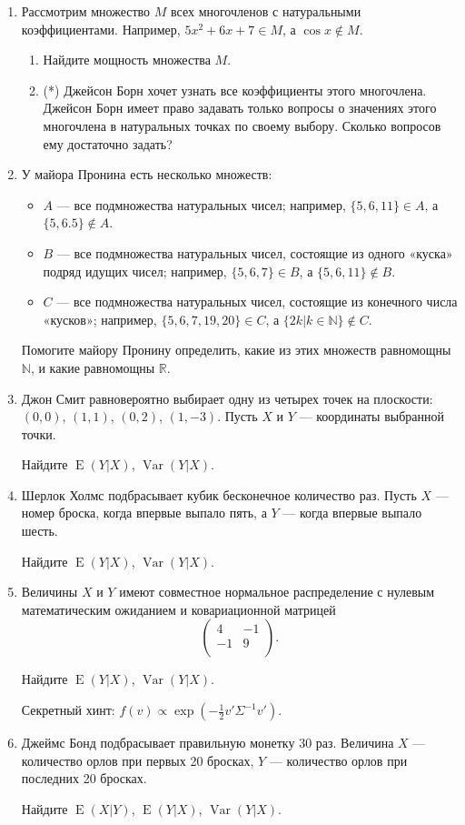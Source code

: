 \documentclass[12pt]{article}
\DeclareMathOperator{\Var}{Var}
\DeclareMathOperator{\E}{E}
\begin{document}
\begin{enumerate}

\item Рассмотрим множество $M$ всех многочленов с натуральными коэффициентами. Например, $5x^2+6x+7 \in M$, а $\cos x \notin M$.
\begin{enumerate}
  \item Найдите мощность множества $M$.
  \item (*) Джейсон Борн хочет узнать все коэффициенты этого многочлена. Джейсон Борн имеет право задавать только вопросы о значениях этого многочлена в натуральных точках по своему выбору. Сколько вопросов ему достаточно задать?
\end{enumerate}

\item У майора Пронина есть несколько множеств:

\begin{itemize}
\item $A$ — все подмножества натуральных чисел; например, $\{5, 6, 11\} \in A$, а $\{5, 6.5\} \notin A$.
\item $B$ — все подмножества натуральных чисел, состоящие из одного «куска» подряд идущих чисел; например, $\{5, 6, 7\} \in B$, а $\{5, 6, 11\} \notin B$.
\item $C$ — все подмножества натуральных чисел, состоящие из конечного числа «кусков»; например, $\{5, 6, 7, 19, 20\} \in C$, а $\{2k | k \in \mathbb{N}\} \notin C$.
\end{itemize}

Помогите майору Пронину определить, какие из этих множеств равномощны $\mathbb{N}$, и какие равномощны $\mathbb{R}$.

\item Джон Смит равновероятно выбирает одну из четырех точек на плоскости: $(0, 0)$, $(1, 1)$, $(0, 2)$, $(1, -3)$. Пусть $X$ и $Y$ — координаты выбранной точки.

Найдите $\E(Y|X)$, $\Var(Y|X)$.

\item Шерлок Холмс подбрасывает кубик бесконечное количество раз. Пусть $X$ — номер броска, когда впервые выпало пять, а $Y$ — когда впервые выпало шесть.

Найдите $\E(Y|X)$, $\Var(Y|X)$.

\item Величины $X$ и $Y$ имеют совместное нормальное распределение с нулевым математическим ожиданием и ковариационной матрицей
\[
\begin{pmatrix}
4 & -1 \\
-1 & 9 \\
\end{pmatrix}.
\]

Найдите $\E(Y|X)$, $\Var(Y|X)$.

Секретный хинт: $f(v) \propto \exp(-\frac{1}{2}v' \Sigma^{-1}v')$.

\item Джеймс Бонд подбрасывает правильную монетку 30 раз. Величина $X$ — количество орлов при первых 20 бросках, $Y$ — количество орлов при последних 20 бросках.

Найдите $\E(X|Y)$, $\E(Y|X)$, $\Var(Y|X)$.

\end{enumerate}
\end{document}
